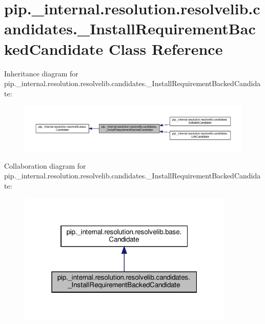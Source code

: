\hypertarget{classpip_1_1__internal_1_1resolution_1_1resolvelib_1_1candidates_1_1__InstallRequirementBackedCandidate}{}\section{pip.\+\_\+internal.\+resolution.\+resolvelib.\+candidates.\+\_\+\+Install\+Requirement\+Backed\+Candidate Class Reference}
\label{classpip_1_1__internal_1_1resolution_1_1resolvelib_1_1candidates_1_1__InstallRequirementBackedCandidate}


Inheritance diagram for pip.\+\_\+internal.\+resolution.\+resolvelib.\+candidates.\+\_\+\+Install\+Requirement\+Backed\+Candidate\+:
\nopagebreak
\begin{figure}[H]
\begin{center}
\leavevmode
\includegraphics[width=350pt]{classpip_1_1__internal_1_1resolution_1_1resolvelib_1_1candidates_1_1__InstallRequirementBackedCandidate__inherit__graph}
\end{center}
\end{figure}


Collaboration diagram for pip.\+\_\+internal.\+resolution.\+resolvelib.\+candidates.\+\_\+\+Install\+Requirement\+Backed\+Candidate\+:
\nopagebreak
\begin{figure}[H]
\begin{center}
\leavevmode
\includegraphics[width=292pt]{classpip_1_1__internal_1_1resolution_1_1resolvelib_1_1candidates_1_1__InstallRequirementBackedCandidate__coll__graph}
\end{center}
\end{figure}
